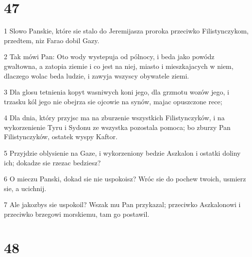 \chapter{47}

\par 1 Slowo Panskie, które sie stalo do Jeremijasza proroka przeciwko Filistynczykom, przedtem, niz Farao dobil Gazy.
\par 2 Tak mówi Pan: Oto wody wystepuja od pólnocy, i beda jako powódz gwaltowna, a zatopia ziemie i co jest na niej, miasto i mieszkajacych w niem, dlaczego wolac beda ludzie, i zawyja wszyscy obywatele ziemi.
\par 3 Dla glosu tetnienia kopyt wasniwych koni jego, dla grzmotu wozów jego, i trzasku kól jego nie obejrza sie ojcowie na synów, majac opuszczone rece;
\par 4 Dla dnia, który przyjsc ma na zburzenie wszystkich Filistynczyków, i na wykorzenienie Tyru i Sydonu ze wszystka pozostala pomoca; bo zburzy Pan Filistynczyków, ostatek wyspy Kaftor.
\par 5 Przyjdzie oblysienie na Gaze, i wykorzeniony bedzie Aszkalon i ostatki doliny ich; dokadze sie rzezac bedziesz?
\par 6 O mieczu Panski, dokad sie nie uspokoisz? Wróc sie do pochew twoich, usmierz sie, a ucichnij.
\par 7 Ale jakozbys sie uspokoil? Wszak mu Pan przykazal; przeciwko Aszkalonowi i przeciwko brzegowi morskiemu, tam go postawil.

\chapter{48}

